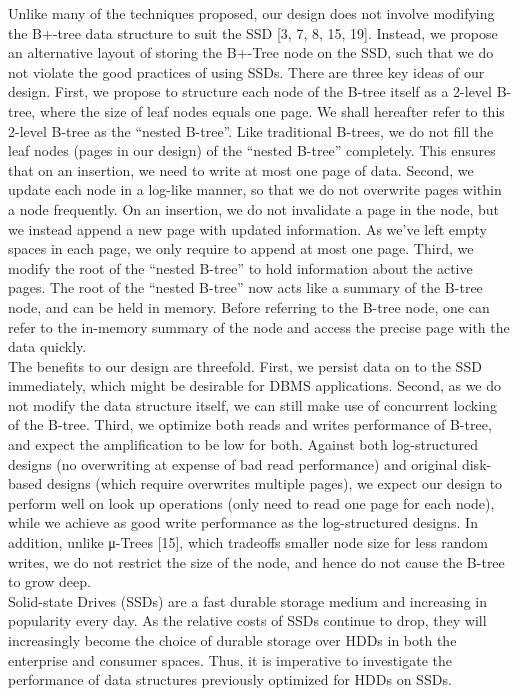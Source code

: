 Unlike many of the techniques proposed, our design does not involve modifying the B+-tree data structure to suit the
SSD [3, 7, 8, 15, 19].
Instead, we propose an alternative layout of storing the B+-Tree node on the SSD, such that we do not violate the good practices of using SSDs.
There are three key ideas of our design.
First, we propose to structure each node of the B-tree itself as a 2-level B-tree, where the size of leaf nodes equals one page.
We shall hereafter refer to this 2-level B-tree as the “nested B-tree”.
Like traditional B-trees, we do not fill the leaf nodes (pages in our design) of the “nested B-tree” completely.
This ensures that on an insertion, we need to write at most one page of data.
Second, we update each node in a log-like manner, so that we do not overwrite pages within a node frequently.
On an insertion, we do not invalidate a page in the node, but we instead append a new page with updated information.
As we’ve left empty spaces in each page, we only require to append at most one page.
Third, we modify the root of the “nested B-tree” to hold information about the active pages.
The root of the “nested B-tree” now acts like a summary of the B-tree node, and can be held in memory.
Before referring to the B-tree node, one can refer to the in-memory summary of the node and access the precise page with the data quickly.\\

The benefits to our design are threefold.
First, we persist data on to the SSD immediately, which might be desirable for DBMS applications.
Second, as we do not modify the data structure itself, we can still make use of concurrent locking of the B-tree.
Third, we optimize both reads and writes performance of B-tree, and expect the amplification to
be low for both.
Against both log-structured designs (no overwriting at expense of bad read performance) and original disk-based designs (which require overwrites multiple pages), we expect our design to perform well on look up operations (only need to read one page for each node), while we achieve as good write performance as the log-structured designs.
In addition, unlike μ-Trees [15], which tradeoffs smaller node size for less random writes, we do not restrict the size of the node, and hence do not cause the B-tree to grow deep.\\



Solid-state Drives (SSDs) are a fast durable storage medium and increasing in popularity every day.
As the relative costs of SSDs continue to drop, they will increasingly become the choice of durable storage over HDDs in both the enterprise and consumer spaces.
Thus, it is imperative to investigate the performance of data structures previously optimized for HDDs on SSDs.\\

